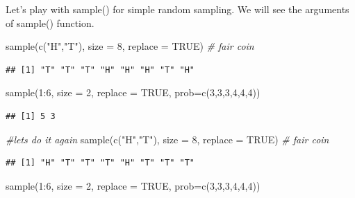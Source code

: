 \documentclass[
]{book}
\newenvironment{Shaded}{\begin{snugshade}}{\end{snugshade}}
\newcommand{\AttributeTok}[1]{\textcolor[rgb]{0.77,0.63,0.00}{#1}}
\newcommand{\CommentTok}[1]{\textcolor[rgb]{0.56,0.35,0.01}{\textit{#1}}}
\newcommand{\ConstantTok}[1]{\textcolor[rgb]{0.00,0.00,0.00}{#1}}
\newcommand{\DecValTok}[1]{\textcolor[rgb]{0.00,0.00,0.81}{#1}}
\newcommand{\FunctionTok}[1]{\textcolor[rgb]{0.00,0.00,0.00}{#1}}
\newcommand{\NormalTok}[1]{#1}
\newcommand{\SpecialCharTok}[1]{\textcolor[rgb]{0.00,0.00,0.00}{#1}}
\newcommand{\StringTok}[1]{\textcolor[rgb]{0.31,0.60,0.02}{#1}}
\theoremstyle{definition}
\theoremstyle{definition}
\theoremstyle{definition}
\theoremstyle{definition}
\theoremstyle{remark}
\begin{document}
Let's play with sample() for simple random sampling. We will see the arguments of sample() function.

\begin{Shaded}
\begin{Highlighting}[]
\FunctionTok{sample}\NormalTok{(}\FunctionTok{c}\NormalTok{(}\StringTok{"H"}\NormalTok{,}\StringTok{"T"}\NormalTok{), }\AttributeTok{size =} \DecValTok{8}\NormalTok{, }\AttributeTok{replace =} \ConstantTok{TRUE}\NormalTok{)  }\CommentTok{\# fair coin}
\end{Highlighting}
\end{Shaded}

\begin{verbatim}
## [1] "T" "T" "T" "H" "H" "H" "T" "H"
\end{verbatim}

\begin{Shaded}
\begin{Highlighting}[]
\FunctionTok{sample}\NormalTok{(}\DecValTok{1}\SpecialCharTok{:}\DecValTok{6}\NormalTok{, }\AttributeTok{size =} \DecValTok{2}\NormalTok{, }\AttributeTok{replace =} \ConstantTok{TRUE}\NormalTok{, }\AttributeTok{prob=}\FunctionTok{c}\NormalTok{(}\DecValTok{3}\NormalTok{,}\DecValTok{3}\NormalTok{,}\DecValTok{3}\NormalTok{,}\DecValTok{4}\NormalTok{,}\DecValTok{4}\NormalTok{,}\DecValTok{4}\NormalTok{))}
\end{Highlighting}
\end{Shaded}

\begin{verbatim}
## [1] 5 3
\end{verbatim}

\begin{Shaded}
\begin{Highlighting}[]
\CommentTok{\#let\textquotesingle{}s do it again}
\FunctionTok{sample}\NormalTok{(}\FunctionTok{c}\NormalTok{(}\StringTok{"H"}\NormalTok{,}\StringTok{"T"}\NormalTok{), }\AttributeTok{size =} \DecValTok{8}\NormalTok{, }\AttributeTok{replace =} \ConstantTok{TRUE}\NormalTok{)  }\CommentTok{\# fair coin}
\end{Highlighting}
\end{Shaded}

\begin{verbatim}
## [1] "H" "T" "T" "T" "H" "T" "T" "T"
\end{verbatim}

\begin{Shaded}
\begin{Highlighting}[]
\FunctionTok{sample}\NormalTok{(}\DecValTok{1}\SpecialCharTok{:}\DecValTok{6}\NormalTok{, }\AttributeTok{size =} \DecValTok{2}\NormalTok{, }\AttributeTok{replace =} \ConstantTok{TRUE}\NormalTok{, }\AttributeTok{prob=}\FunctionTok{c}\NormalTok{(}\DecValTok{3}\NormalTok{,}\DecValTok{3}\NormalTok{,}\DecValTok{3}\NormalTok{,}\DecValTok{4}\NormalTok{,}\DecValTok{4}\NormalTok{,}\DecValTok{4}\NormalTok{))}
\end{Highlighting}
\end{Shaded}
\end{document}
